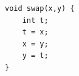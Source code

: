 \documentclass{jarticle}
\begin{document}
\begin{Verbatim}
void swap(x,y) {
    int t;
    t = x;
    x = y;
    y = t;
}
\end{Verbatim}
\end{document}
